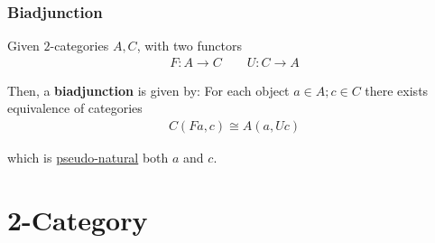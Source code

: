\documentclass[Total.tex]{subfiles}
\begin{document}
			\subsubsection{Biadjunction}
			\begin{Def}
				Given $2$-categories $A,C$, with two functors
				\begin{gather*}
					F:A\rightarrow C\qquad U:C\rightarrow A
				\end{gather*}
				
				Then, a \textbf{biadjunction} is given by: For each object $a\in A;c\in C$ there exists equivalence of categories
				\begin{gather*}
					C(Fa,c)\cong A(a,Uc)
				\end{gather*}
				
				which is \underline{pseudo-natural} both $a$ and $c$.
			\end{Def}
		
			\section{2-Category}
\end{document}
